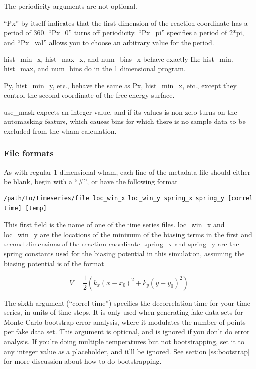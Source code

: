 \documentclass[12pt]{article}
\begin{document}
The periodicity arguments are not optional.

``Px'' by itself indicates that the first dimension of the reaction coordinate
has a period of 360.  ``Px=0'' turns off periodicity.  ``Px=pi'' specifies a
period of 2*pi, and ``Px=val'' allows you to choose an arbitrary value for
the period.

hist\_min\_x, hist\_max\_x, and num\_bins\_x behave exactly like hist\_min,
hist\_max, and num\_bins do in the 1 dimensional program.

Py, hist\_min\_y, etc., behave the same as Px, hist\_min\_x, etc., except they
control the second coordinate of the free energy surface.

use\_mask expects an integer value, and if its values is non-zero turns on
the automasking feature, which causes bins for which there is no sample data
to be excluded from the wham calculation.

\subsubsection{File formats}

As with regular 1 dimensional wham, each line of the metadata file should
either be blank, begin with a ``\#'', or have the following format

\begin{footnotesize}
\begin{verbatim}
/path/to/timeseries/file loc_win_x loc_win_y spring_x spring_y [correl time] [temp]
\end{verbatim}
\end{footnotesize}

This first field is the name of one of the time series files.  loc\_win\_x
and loc\_win\_y are the locations of the minimum of the biasing terms in the
first and second dimensions of the reaction coordinate.  spring\_x and
spring\_y are the spring constants used for the biasing potential in this
simulation, assuming the biasing potential is of the format

\begin{equation}
V = \frac{1}{2} ( k_x (x - x_0)^2 + k_y (y -y_0)^2 )
\end{equation}

The sixth argument (``correl time'') specifies the decorrelation time for
your time series, in units of time steps.  It is only used when generating
fake data sets for Monte Carlo bootstrap error analysis, where it modulates
the number of points per fake data set.  This argument is optional, and is
ignored if you don't do error analysis.  If you're doing multiple
temperatures but not bootstrapping, set it to any integer value as a
placeholder, and it'll be ignored.  See section \ref{ss:bootstrap} for more
discussion about how to do bootstrapping.
\end{document}
